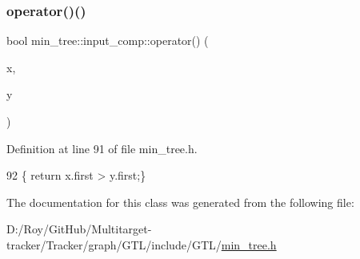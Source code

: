 \subsubsection{\texorpdfstring{operator()()}{operator()()}}
{\footnotesize\ttfamily bool min\+\_\+tree\+::input\+\_\+comp\+::operator() (\begin{DoxyParamCaption}\item[{\mbox{\hyperlink{classmin__tree_af83e196caf3ebcdc9035dc42aee581ee}{T\+S\+P\+\_\+\+A\+\_\+\+V\+A\+L\+UE}}}]{x,  }\item[{\mbox{\hyperlink{classmin__tree_af83e196caf3ebcdc9035dc42aee581ee}{T\+S\+P\+\_\+\+A\+\_\+\+V\+A\+L\+UE}}}]{y }\end{DoxyParamCaption})\hspace{0.3cm}{\ttfamily [inline]}}



Definition at line 91 of file min\+\_\+tree.\+h.


\begin{DoxyCode}
92         \{ \textcolor{keywordflow}{return} x.first > y.first;\}
\end{DoxyCode}


The documentation for this class was generated from the following file\+:\begin{DoxyCompactItemize}
\item 
D\+:/\+Roy/\+Git\+Hub/\+Multitarget-\/tracker/\+Tracker/graph/\+G\+T\+L/include/\+G\+T\+L/\mbox{\hyperlink{min__tree_8h}{min\+\_\+tree.\+h}}\end{DoxyCompactItemize}
